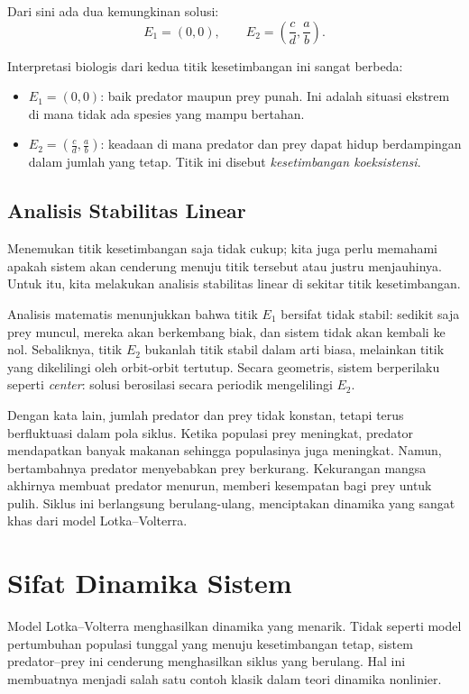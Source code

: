 \documentclass{bukumjh}
\begin{document}
Dari sini ada dua kemungkinan solusi:
\[
E_1 = (0,0), \qquad 
E_2 = \left(\frac{c}{d}, \frac{a}{b}\right).
\]

Interpretasi biologis dari kedua titik kesetimbangan ini sangat berbeda:
\begin{itemize}
    \item $E_1 = (0,0)$: baik predator maupun prey punah. Ini adalah situasi ekstrem di mana tidak ada spesies yang mampu bertahan.
    \item $E_2 = \left(\tfrac{c}{d}, \tfrac{a}{b}\right)$: keadaan di mana predator dan prey dapat hidup berdampingan dalam jumlah yang tetap. Titik ini disebut \textit{kesetimbangan koeksistensi}.
\end{itemize}

\subsection{Analisis Stabilitas Linear}

Menemukan titik kesetimbangan saja tidak cukup; kita juga perlu memahami apakah sistem akan cenderung menuju titik tersebut atau justru menjauhinya. Untuk itu, kita melakukan analisis stabilitas linear di sekitar titik kesetimbangan.

Analisis matematis menunjukkan bahwa titik $E_1$ bersifat tidak stabil: sedikit saja prey muncul, mereka akan berkembang biak, dan sistem tidak akan kembali ke nol. Sebaliknya, titik $E_2$ bukanlah titik stabil dalam arti biasa, melainkan titik yang dikelilingi oleh orbit-orbit tertutup. Secara geometris, sistem berperilaku seperti \textit{center}: solusi berosilasi secara periodik mengelilingi $E_2$.

Dengan kata lain, jumlah predator dan prey tidak konstan, tetapi terus berfluktuasi dalam pola siklus. Ketika populasi prey meningkat, predator mendapatkan banyak makanan sehingga populasinya juga meningkat. Namun, bertambahnya predator menyebabkan prey berkurang. Kekurangan mangsa akhirnya membuat predator menurun, memberi kesempatan bagi prey untuk pulih. Siklus ini berlangsung berulang-ulang, menciptakan dinamika yang sangat khas dari model Lotka–Volterra.

\section{Sifat Dinamika Sistem}

Model Lotka–Volterra menghasilkan dinamika yang menarik. Tidak seperti model pertumbuhan populasi tunggal yang menuju kesetimbangan tetap, sistem predator–prey ini cenderung menghasilkan siklus yang berulang. Hal ini membuatnya menjadi salah satu contoh klasik dalam teori dinamika nonlinier.
\end{document}
